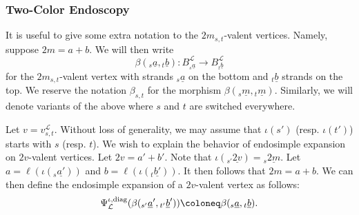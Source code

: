 \documentclass{amsart}
\newcommand{\scrL}{\mathcal{L}}
\theoremstyle{definition}
\numberwithin{equation}{subsection}
\begin{document}
\subsubsection{Two-Color Endoscopy}

It is useful to give some extra notation to the $2m_{s,t}$-valent vertices.
Namely, suppose $2m = a+b$. We will then write
\[\beta ( {}_s \underline{a}, {}_t \underline{b} ) : B_{{}_s \underline{a}}^{\scrL} \to B_{{}_t \underline{b}}^{\scrL}\]
for the $2m_{s,t}$-valent vertex with strands ${}_s \underline{a}$ on the bottom and ${}_t \underline{b}$ strands on the top.
We reserve the notation $\beta_{s,t}$ for the morphism $\beta ({}_s \underline{m}, {}_t \underline{m})$.
Similarly, we will denote variants of the above where $s$ and $t$ are switched everywhere.

Let $v = v_{s,t}^{\scrL}$. Without loss of generality, we may assume that $\iota (s')$ (resp. $\iota (t')$) starts with $s$ (resp. $t$).
We wish to explain the behavior of endosimple expansion on $2v$-valent vertices.
Let $2v = a' + b'$. Note that $\iota ({}_{s'} \underline{2v}) = {}_s \underline{2m}$.
Let $a = \ell (\iota ({}_s \underline{a'}))$ and $b = \ell (\iota ({}_t \underline{b'}))$.
It then follows that $2m = a + b$.
We can then define the endosimple expansion of a $2v$-valent vertex as follows:
\begin{equation}\label{eq:Psi_on_2v_valent_vertices}
    \Psi_{\scrL}^{\iota, \textnormal{diag}} (\beta ({}_{s'} \underline{a}', {}_{t'} \underline{b}') ) \coloneq \beta ({}_s \underline{a}, {}_t \underline{b}).
\end{equation}

\allowdisplaybreaks
\end{document}
